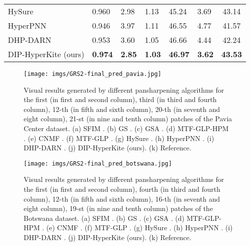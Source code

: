 \documentclass[journal]{IEEEtran}
\begin{document}
\begin{table}[tb]
\begin{tabular}{lp{0.5cm}p{0.5cm}p{0.6cm}p{0.5cm}p{0.6cm}c}
        HySure \cite{hysure}            & 0.960            & 2.98            & 1.13            & 45.24           & 3.69            & 43.14\\
        HyperPNN \cite{Hyper-PNN}       & 0.946             & 3.97          & 1.11              & 46.55         & 4.77              & 41.57\\
        DHP-DARN \cite{DHP-DARN}        & 0.953            & 3.60            & 1.05            & 46.66           & 4.44            & 42.24\\
        DIP-HyperKite (ours)            & \textbf{0.974}  & \textbf{2.85}   & \textbf{1.03}     & \textbf{46.97}           & \textbf{3.62}            & \textbf{43.53}\\
        \hline 
        \end{tabular}
        \label{tab:chikusei_final_fuse_quant}
    \end{table}
    
    \begin{figure}[tb]
        \centering
        \texttt{[image: imgs/GRS2-final\_pred\_pavia.jpg]}
        \caption{Visual results generated by different pansharpening algorithms for the first (in first and second column), third (in third and fourth column), 12-th (in fifth and sixth column), 20-th (in seventh and eight column), 21-st (in nine and tenth column) patches of the Pavia Center dataset. (a) SFIM \cite{SFIM}. (b) GS \cite{GS}. (c) GSA \cite{GS}. (d) MTF-GLP-HPM \cite{MTF-GLP-HPM}. (e) CNMF \cite{CNMF}. (f) MTF-GLP \cite{MTF-GLP}. (g) HySure \cite{hysure}. (h) HyperPNN \cite{Hyper-PNN}. (i) DHP-DARN \cite{DHP-DARN}. (j) DIP-HyperKite (ours). (k) Reference.}
        \label{fig:pavia_final}
    \end{figure}
    
    \begin{figure}[tb]
        \centering
        \texttt{[image: imgs/GRS2-final\_pred\_botswana.jpg]}
        \caption{Visual results generated by different pansharpening algorithms for the first (in first and second column), fourth (in third and fourth column), 12-th (in fifth and sixth column), 16-th (in seventh and eight column), 19-st (in nine and tenth column) patches of the Botswana dataset. (a) SFIM \cite{SFIM}. (b) GS \cite{GS}. (c) GSA \cite{GS}. (d) MTF-GLP-HPM \cite{MTF-GLP-HPM}. (e) CNMF \cite{CNMF}. (f) MTF-GLP \cite{MTF-GLP}. (g) HySure \cite{hysure}. (h) HyperPNN \cite{Hyper-PNN}. (i) DHP-DARN \cite{DHP-DARN}. (j) DIP-HyperKite (ours). (k) Reference.}
        \label{fig:botswana_final}
    \end{figure}
    
\end{document}
